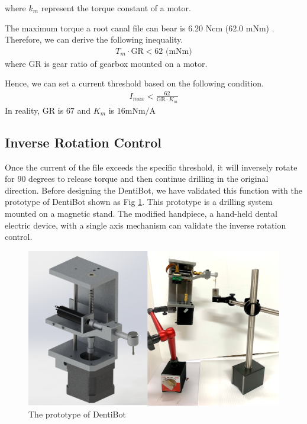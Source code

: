 where $k_m$ represent the torque constant of a motor.
\par\noindent
The maximum torque a root canal file can bear is $6.20$ Ncm ($62.0$ mNm) \cite{boessler2009effect}. Therefore, we can derive the following inequality.
\begin{equation}
\begin{split}
T_m \cdot \mathrm{GR} < 62 \text{ (mNm)}
\end{split}
\end{equation}
where $\mathrm{GR}$ is gear ratio of gearbox mounted on a motor.
\par
Hence, we can set a current threshold based on the following condition. 
\begin{equation}
\begin{split}
I_{max} < \frac{62}{\mathrm{GR} \cdot K_m}
\end{split}
\end{equation} 
In reality, $\mathrm{GR}$ is $67$ and $K_m$ is $16 \text{mNm/A}$
\subsection{Inverse Rotation Control}
\label{sec:Inverse Rotation Control}
\hspace*{6mm}Once the current of the file exceeds the specific threshold, it will inversely rotate for 90 degrees to release torque and then continue drilling in the original direction. Before designing the DentiBot, we have validated this function with the prototype of DentiBot shown as Fig \ref{fig: prototype}. This prototype is a drilling system mounted on a magnetic stand. The modified handpiece, a hand-held dental electric device, with a single axis mechanism can validate the inverse rotation control. 
\begin{figure}[htbp]
\begin{center}
\includegraphics[width=1\linewidth]{Images/Prototype.png}
\caption{The prototype of DentiBot}
\label{fig: prototype}
\end{center}
\end{figure}	


